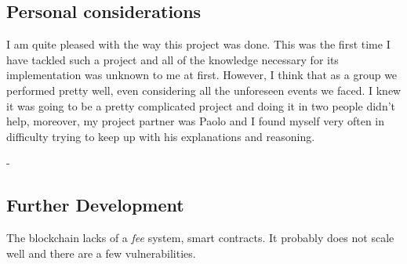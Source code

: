 \documentclass[../documentation.tex]{subfiles}
\begin{document}
\subsection{Personal considerations}



I am quite pleased with the way this project was done. This was the first time I have tackled such a project and all of the
knowledge necessary for its implementation was unknown to me at first. However, I think that as a group we performed
pretty well, even considering all the unforeseen events we faced. I knew it was going to be a pretty complicated project
and doing it in two people didn't help, moreover, my project partner was Paolo and I found myself very often in difficulty trying to
keep up with his explanations and reasoning.

-

\subsection{Further Development}

The blockchain lacks of a \textit{fee} system, smart contracts.
It probably does not scale well and there are a few vulnerabilities.
\end{document}
